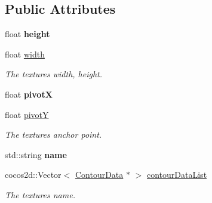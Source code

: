 \subsection*{Public Attributes}
\begin{DoxyCompactItemize}
\item 
\mbox{\label{classcocostudio_1_1TextureData_a271107f19eb69113e8b729935e7d6126}} 
float {\bfseries height}
\item 
\mbox{\label{classcocostudio_1_1TextureData_a66efade439ab9004435c3e30a6bb3a8f}} 
float \hyperlink{classcocostudio_1_1TextureData_a66efade439ab9004435c3e30a6bb3a8f}{width}
\begin{DoxyCompactList}\small\item\em The texture\textquotesingle{}s width, height. \end{DoxyCompactList}\item 
\mbox{\label{classcocostudio_1_1TextureData_a5c44f02810a6bbb4a45ee8b4e69edd2e}} 
float {\bfseries pivotX}
\item 
\mbox{\label{classcocostudio_1_1TextureData_ad710cab2ab2d062e5d74b0cdd77b2458}} 
float \hyperlink{classcocostudio_1_1TextureData_ad710cab2ab2d062e5d74b0cdd77b2458}{pivotY}
\begin{DoxyCompactList}\small\item\em The texture\textquotesingle{}s anchor point. \end{DoxyCompactList}\item 
\mbox{\label{classcocostudio_1_1TextureData_a7cf132dcbe4d8457f2dbafa7af07a2e1}} 
std\+::string {\bfseries name}
\item 
\mbox{\label{classcocostudio_1_1TextureData_aa6067793d7472996ae968e73a8cb0d89}} 
cocos2d\+::\+Vector$<$ \hyperlink{classcocostudio_1_1ContourData}{Contour\+Data} $\ast$ $>$ \hyperlink{classcocostudio_1_1TextureData_aa6067793d7472996ae968e73a8cb0d89}{contour\+Data\+List}
\begin{DoxyCompactList}\small\item\em The texture\textquotesingle{}s name. \end{DoxyCompactList}\end{DoxyCompactItemize}


